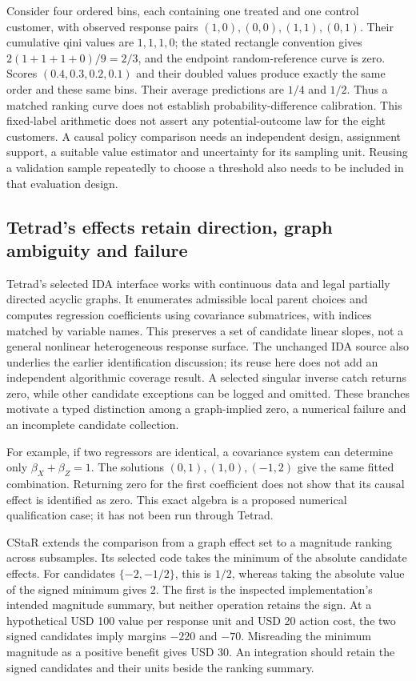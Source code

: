 Consider four ordered bins, each containing one treated and one control
customer, with observed response pairs $(1,0),(0,0),(1,1),(0,1)$. Their
cumulative qini values are $1,1,1,0$; the stated rectangle convention gives
$2(1+1+1+0)/9=2/3$, and the endpoint random-reference curve is zero. Scores
$(0.4,0.3,0.2,0.1)$ and their doubled values produce exactly the same order
and these same bins. Their average predictions are $1/4$ and $1/2$. Thus a
matched ranking curve does not establish probability-difference calibration.
This fixed-label arithmetic does not assert any potential-outcome law for
the eight customers. A causal policy comparison needs an independent design,
assignment support, a suitable value estimator and uncertainty for its sampling
unit. Reusing a validation sample repeatedly to choose a threshold also needs
to be included in that evaluation design.
\citep{exec20_javaeffects_reference}

\subsection{Tetrad's effects retain direction, graph ambiguity and failure}
\label{exec20:javafx-graphs}

Tetrad's selected IDA interface works with continuous data and legal partially
directed acyclic graphs. It enumerates admissible local parent choices and
computes regression coefficients using covariance submatrices, with indices
matched by variable names. This preserves a set of candidate linear slopes,
not a general nonlinear heterogeneous response surface. The unchanged IDA
source also underlies the earlier identification discussion; its reuse here
does not add an independent algorithmic coverage result. A selected singular
inverse catch returns zero, while other candidate exceptions can be logged
and omitted. These branches motivate a typed distinction among a graph-implied
zero, a numerical failure and an incomplete candidate collection.
\citep{exec20_javaeffects_tetrad}

For example, if two regressors are identical, a covariance system can determine
only $\beta_X+\beta_Z=1$. The solutions $(0,1),(1,0),(-1,2)$ give the
same fitted combination. Returning zero for the first coefficient does not
show that its causal effect is identified as zero. This exact algebra is a
proposed numerical qualification case; it has not been run through Tetrad.
\citep{exec20_javaeffects_reference}

CStaR extends the comparison from a graph effect set to a magnitude ranking
across subsamples. Its selected code takes the minimum of the absolute
candidate effects. For candidates $\{-2,-1/2\}$, this is $1/2$, whereas
taking the absolute value of the signed minimum gives $2$. The first is the
inspected implementation's intended magnitude summary, but neither operation
retains the sign. At a hypothetical USD 100 value per response unit and USD 20
action cost, the two signed candidates imply margins $-220$ and $-70$.
Misreading the minimum magnitude as a positive benefit gives USD 30. An
integration should retain the signed candidates and their units beside the
ranking summary.
\citep{exec20_javaeffects_tetrad,exec20_javaeffects_reference}


